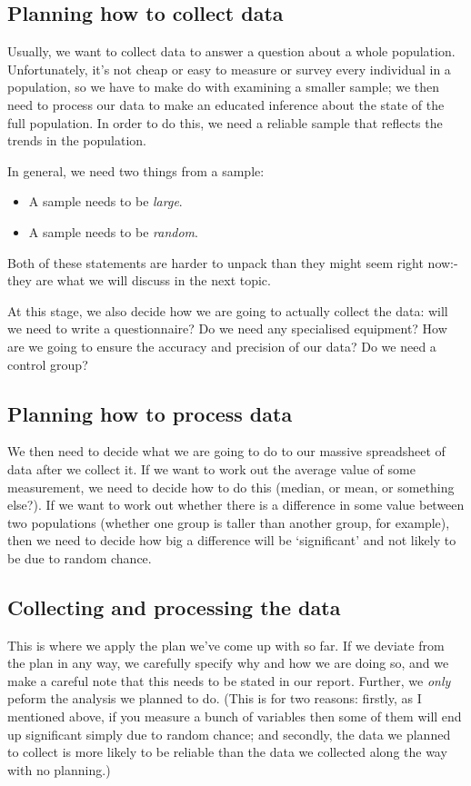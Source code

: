 \subsection*{Planning how to collect data}
Usually, we want to collect data to answer a question about a whole population. Unfortunately, it's not cheap or easy to measure or survey
every individual in a population, so we have to make do with examining a smaller sample; we then need to process our data to make an educated
inference about the state of the full population. In order to do this, we need a reliable sample that reflects the trends in the population.

In general, we need two things from a sample:
\begin{itemize}
  \item A sample needs to be \emph{large}.
  \item A sample needs to be \emph{random}.
\end{itemize}

Both of these statements are harder to unpack than they might seem right now:- they are what we will
discuss in the next topic.

At this stage, we also decide how we are going to actually collect the data: will we need to write a questionnaire? Do we need
any specialised equipment? How are we going to ensure the accuracy and precision of our data? Do we need a control group?

\subsection*{Planning how to process data}
We then need to decide what we are going to do to our massive spreadsheet of data after we collect it. If we want to work
out the average value of some measurement, we need to decide how to do this (median, or mean, or something else?). If we
want to work out whether there is a difference in some value between two populations (whether one group is taller than
another group, for example), then we need to decide how big a difference will be `significant' and not likely to be due
to random chance.

\subsection*{Collecting and processing the data}
This is where we apply the plan we've come up with so far. If we deviate from the plan in any way, we carefully specify
why and how we are doing so, and we make a careful note that this needs to be stated in our report. Further, we \emph{only}
peform the analysis we planned to do. (This is for two reasons: firstly, as I mentioned above, if you measure a bunch of
variables then some of them will end up significant simply due to random chance; and secondly, the data we planned to
collect is more likely to be reliable than the data we collected along the way with no planning.)

